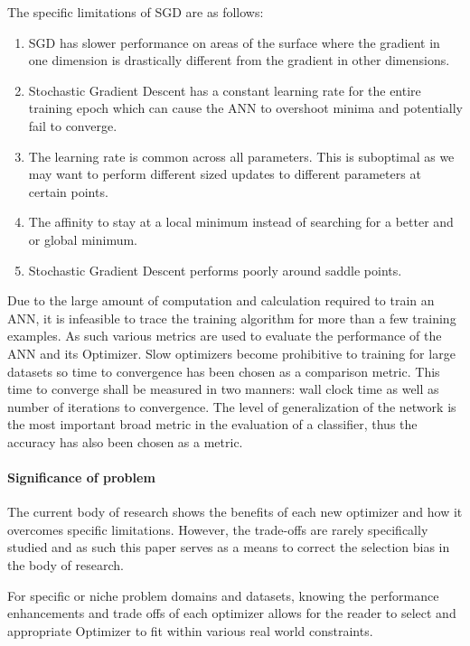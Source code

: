 \documentclass{article}
\begin{document}
	The specific limitations of SGD are as follows:
	\begin{enumerate}
		\item SGD has slower performance on areas of the surface where the gradient in one dimension is drastically different from the gradient in other dimensions.
		
		\item Stochastic Gradient Descent has a constant learning rate for the entire training epoch which can cause the ANN to overshoot minima and potentially fail to converge.
		
		\item The learning rate is common across all parameters. This is suboptimal as we may want to perform different sized updates to different parameters at certain points.
		
		\item The affinity to stay at a local minimum instead of searching for a better and or global minimum.
		
		\item Stochastic Gradient Descent performs poorly around saddle points.
	\end{enumerate}


	Due to the large amount of computation and calculation required to train an ANN, it is infeasible to trace the training algorithm for more than a few training examples. As such various metrics are used to evaluate the performance of the ANN and its Optimizer. Slow optimizers become prohibitive to training for large datasets so time to convergence has been chosen as a comparison metric. This time to converge shall be measured in two manners: wall clock time as well as number of iterations to convergence. The level of generalization of the network is the most important broad metric in the evaluation of a classifier, thus the accuracy has also been chosen as a metric. 
	
	\paragraph{Significance of problem}
	The current body of research shows the benefits of each new optimizer and how it overcomes specific limitations. However, the trade-offs are rarely specifically studied and as such this paper serves as a means to correct the selection bias in the body of research. 
	
	For specific or niche problem domains and datasets, knowing the performance enhancements and trade offs of each optimizer allows for the reader to select and appropriate Optimizer to fit within various real world constraints.
	
\end{document}
